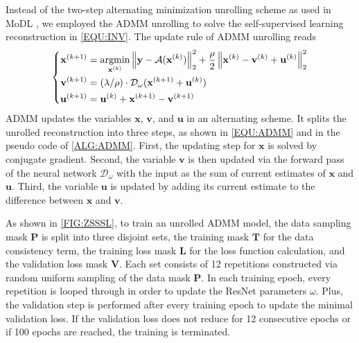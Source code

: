 \documentclass[AMA,STIX2COL,Linenumberson]{MRM}
\newcommand{\argmin}{\operatornamewithlimits{argmin}}
\newcommand{\norm}[1]{\left\lVert#1\right\rVert}
\begin{document}
Instead of the two-step alternating minimization unrolling scheme as used in MoDL
\cite{aggarwal_2018_modl},
we employed the ADMM unrolling
to solve the self-supervised learning reconstruction
in \cref{EQU:INV}. The update rule of ADMM unrolling reads
\begin{equation} \label{EQU:ADMM}
    \left\{\begin{aligned}
        \mathbf{x}^{(k+1)} &= \argmin_{\mathbf{x}^{(k)}} \norm{\mathbf{y} - \mathcal{A}(\mathbf{x}^{(k)})}_2^2 + \frac{\rho}{2} \norm{ \mathbf{x}^{(k)} - \mathbf{v}^{(k)} + \mathbf{u}^{(k)}}_2^2 \\
        \mathbf{v}^{(k+1)} &= (\lambda/\rho) \cdot \mathcal{D}_{\omega} (\mathbf{x}^{(k+1)} + \mathbf{u}^{(k)}) \\
        \mathbf{u}^{(k+1)} &= \mathbf{u}^{(k)} + \mathbf{x}^{(k+1)} - \mathbf{v}^{(k+1)}
    \end{aligned}\right.
\end{equation}
ADMM updates the variables $\mathbf{x}$, $\mathbf{v}$,
and $\mathbf{u}$ in an alternating scheme.
It splits the unrolled reconstruction into three steps,
as shown in \cref{EQU:ADMM} and in the pseudo code of \cref{ALG:ADMM}.
First, the updating step for $\mathbf{x}$ is solved by conjugate gradient.
Second, the variable $\mathbf{v}$ is then updated
via the forward pass of the neural network $\mathcal{D}_{\omega}$
with the input as the sum of current estimates
of $\mathbf{x}$ and $\mathbf{u}$.
Third, the variable $\mathbf{u}$ is updated
by adding its current estimate to the difference
between $\mathbf{x}$ and $\mathbf{v}$.

As shown in \cref{FIG:ZSSSL}, to train an unrolled ADMM model,
the data sampling mask $\mathbf{P}$
is split into three disjoint sets,
the training mask $\mathbf{T}$ for the data consistency term,
the training loss mask $\mathbf{L}$ for the loss function calculation,
and the validation loss mask $\mathbf{V}$.
Each set consists of 12 repetitions constructed via random uniform sampling
of the data mask $\mathbf{P}$.
In each training epoch, every repetition is looped through
in order to update the ResNet parameters $\omega$.
Plus, the validation step is performed after every training epoch
to update the minimal validation loss.
If the validation loss does not reduce for 12 consecutive epochs or
if 100 epochs are reached, the training is terminated.
\end{document}
